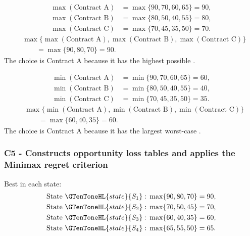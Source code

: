 	\[
	\begin{aligned}
		\max(\text{Contract A}) &= \max\{90,70,60,65\}=90,\\
		\max(\text{Contract B}) &= \max\{80,50,40,55\}=80,\\
		\max(\text{Contract C}) &= \max\{70,45,35,50\}=70.
	\end{aligned}
	\]
	\[
	\begin{aligned}
		&\max\{\max(\text{Contract A}),\max(\text{Contract B}),
		\max(\text{Contract C})\}\\
		&\qquad=\max\{90,80,70\}
		=90.
	\end{aligned}
	\]
	The  choice is Contract A because it has the highest possible .
	
	\[
	\begin{aligned}
		\min(\text{Contract A}) &= \min\{90,70,60,65\}=60,\\
		\min(\text{Contract B}) &= \min\{80,50,40,55\}=40,\\
		\min(\text{Contract C}) &= \min\{70,45,35,50\}=35.
	\end{aligned}
	\]
	\[
	\begin{aligned}
		&\max\{\min(\text{Contract A}),\min(\text{Contract B}),
		\min(\text{Contract C})\}\\
		&\qquad=\max\{60,40,35\}
		=60.
	\end{aligned}
	\]
	The  choice is Contract A because it has the largest worst-case .
	
	\subsubsection*{C5 - Constructs opportunity loss tables and applies the Minimax regret criterion}
	\label{subsec:supply-contract-4x3-c5}
	
	Best  in each state:
	\[
	\begin{aligned}
		\text{State }\GTenToneHL{state}{S_1}:\;&\max\{90,80,70\}=90,\\
		\text{State }\GTenToneHL{state}{S_2}:\;&\max\{70,50,45\}=70,\\
		\text{State }\GTenToneHL{state}{S_3}:\;&\max\{60,40,35\}=60,\\
		\text{State }\GTenToneHL{state}{S_4}:\;&\max\{65,55,50\}=65.
	\end{aligned}
	\]
	
